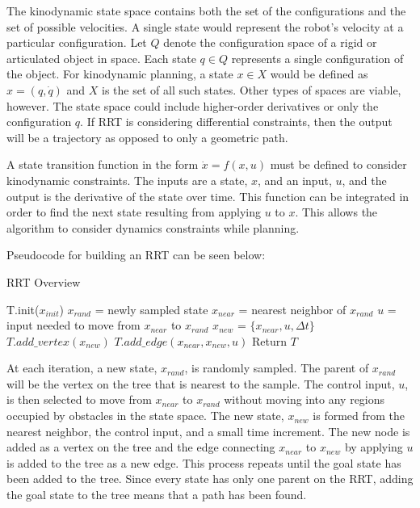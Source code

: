 \documentclass[10pt,conference]{ieeeconf}
\begin{document}
The kinodynamic state space contains both the set of the configurations and the set of possible velocities. A single state would represent the robot's velocity at a particular configuration. Let $Q$ denote the configuration space of a rigid or articulated object in space. Each state $q \in Q$ represents a single configuration of the object. For kinodynamic planning, a state $x \in X$ would be defined as $x=(q,\dot{q})$ and $X$ is the set of all such states. Other types of spaces are viable, however. The state space could include higher-order derivatives or only the configuration $q$. If RRT is considering differential constraints, then the output will be a trajectory as opposed to only a geometric path.

A state transition function in the form $\dot{x} = f(x,u)$ must be defined to consider kinodynamic constraints. The inputs are a state, $x$, and an input, $u$, and the output is the derivative of the state over time. This function can be integrated in order to find the next state resulting from applying $u$ to $x$. This allows the algorithm to consider dynamics constraints while planning. 

Pseudocode for building an RRT can be seen below:

\begin{algorithm}
\caption{RRT Overview}
\begin{algorithmic}[1]
\State T.init($x_{init}$)
\State $x_{rand}$ = newly sampled state
\State $x_{near}$ = nearest neighbor of $x_{rand}$
\State $u$ = input needed to move from $x_{near}$ to $x_{rand}$
\State $x_{new}$ = $\{x_{near}, u, \Delta t\}$
\State $T.add\_vertex(x_{new})$
\State $T.add\_edge(x_{near}, x_{new}, u)$
\EndWhile
\State Return $T$
\EndFunction
\end{algorithmic}
\end{algorithm}

At each iteration, a new state, $x_{rand}$, is randomly sampled. The parent of $x_{rand}$ will be the vertex on the tree that is nearest to the sample. The control input, $u$, is then selected to move from $x_{near}$ to $x_{rand}$ without moving into any regions occupied by obstacles in the state space. The new state, $x_{new}$ is formed from the nearest neighbor, the control input, and a small time increment. The new node is added as a vertex on the tree and the edge connecting $x_{near}$ to $x_{new}$ by applying $u$ is added to the tree as a new edge. This process repeats until the goal state has been added to the tree. Since every state has only one parent on the RRT, adding the goal state to the tree means that a path has been found. 
\end{document}
